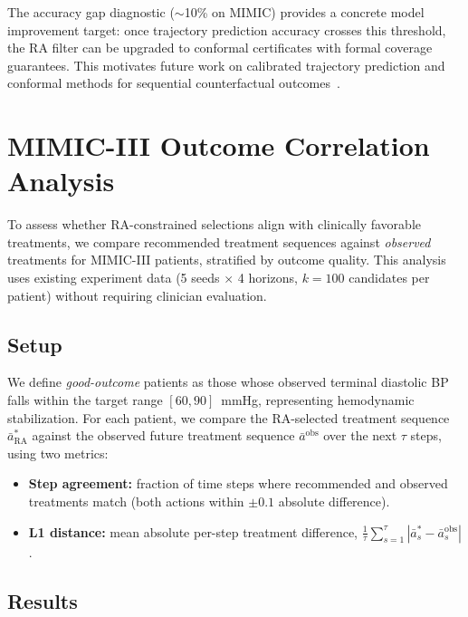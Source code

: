\documentclass{article}
\newcommand{\ba}{\bar{a}}
\begin{document}
\noindent The accuracy gap diagnostic ($\sim$10\% on MIMIC) provides a concrete model improvement target: once trajectory prediction accuracy crosses this threshold, the RA filter can be upgraded to conformal certificates with formal coverage guarantees. This motivates future work on calibrated trajectory prediction and conformal methods for sequential counterfactual outcomes~\citep{lei2021conformal}.


\section{MIMIC-III Outcome Correlation Analysis}
\label{app:outcome_correlation}

To assess whether RA-constrained selections align with clinically favorable treatments, we compare recommended treatment sequences against \emph{observed} treatments for MIMIC-III patients, stratified by outcome quality. This analysis uses existing experiment data (5 seeds $\times$ 4 horizons, $k = 100$ candidates per patient) without requiring clinician evaluation.

\subsection{Setup}

We define \emph{good-outcome} patients as those whose observed terminal diastolic BP falls within the target range $[60, 90]$~mmHg, representing hemodynamic stabilization. For each patient, we compare the RA-selected treatment sequence $\ba^*_{\mathrm{RA}}$ against the observed future treatment sequence $\ba^{\mathrm{obs}}$ over the next $\tau$ steps, using two metrics:
\begin{itemize}
    \item \textbf{Step agreement:} fraction of time steps where recommended and observed treatments match (both actions within $\pm 0.1$ absolute difference).
    \item \textbf{L1 distance:} mean absolute per-step treatment difference, $\frac{1}{\tau} \sum_{s=1}^{\tau} |\ba^*_s - \ba^{\mathrm{obs}}_s|$.
\end{itemize}

\subsection{Results}
\end{document}
